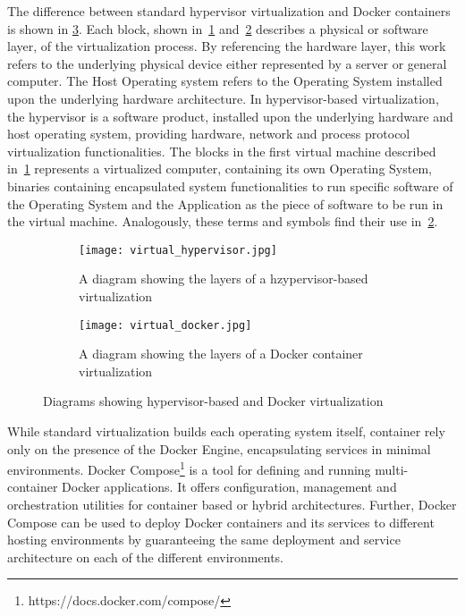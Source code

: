 \documentclass[
a4paper,
twoside,
headsepline,
cleardoublepage=empty,
parskip=half,
draft=false
]{scrbook}
\begin{document}
			The difference between standard hypervisor virtualization and Docker containers is shown in \cref{fig:virtualization}.
			Each block, shown in~\cref{subfig:hypervisor} and~\cref{subfig:docker} describes a physical or software layer, of the virtualization process. 
			By referencing the hardware layer, this work refers to the underlying physical device either represented by a server or general computer. 
			The Host Operating system refers to the Operating System installed upon the underlying hardware architecture.
			In hypervisor-based virtualization, the hypervisor is a software product, installed upon the underlying hardware and host operating system, providing hardware, network and process protocol virtualization functionalities.
			The blocks in the first virtual machine described in~\cref{subfig:hypervisor} represents a virtualized computer, containing its own Operating System, binaries containing encapsulated system functionalities to run specific software of the Operating System and the Application as the piece of software to be run in the virtual machine.
			Analogously, these terms and symbols find their use in~\cref{subfig:docker}.
			
			\begin{figure}[htbp]
				\centering
				\begin{subfigure}{0.45\textwidth}
					\centering
					\texttt{[image: virtual\_hypervisor.jpg]}
					\caption{A diagram showing the layers of a hzypervisor-based virtualization}
					\label{subfig:hypervisor}
				\end{subfigure}
				\hfill
				\begin{subfigure}{0.45\textwidth}
					\centering
					\texttt{[image: virtual\_docker.jpg]}
					\caption{A diagram showing the layers of a Docker container virtualization}
					\label{subfig:docker}
				\end{subfigure}
				\caption{Diagrams showing hypervisor-based and Docker virtualization}
				\label{fig:virtualization}
			\end{figure}
			
			While standard virtualization builds each operating system itself, container rely only on the presence of the Docker Engine, encapsulating services in minimal environments.
			Docker Compose\footnote{https://docs.docker.com/compose/} is a tool for defining and running multi-container Docker applications. It offers configuration, management and orchestration utilities for container based or hybrid architectures. Further, Docker Compose can be used to deploy Docker containers and its services to different hosting environments by guaranteeing the same deployment and service architecture on each of the different environments.
\end{document}
